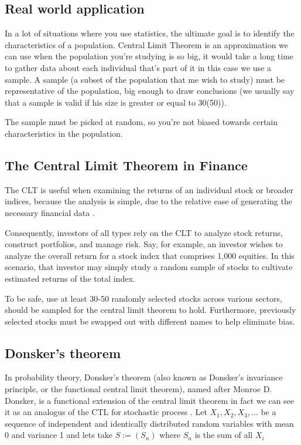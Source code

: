 \documentclass{article}
\begin{document}
\subsection{Real world application}
In a lot of situations where you use statistics, the ultimate goal is to identify the characteristics of a population.\cite{Tijms2007Understanding}
Central Limit Theorem is an approximation we can use when the population you’re studying is so big, it would take a long time to gather data about each individual that’s part of it in this case we use a sample.
A sample  (a subset of the population that me wish to study) must be representative of the population,
big enough to draw conclusions (we usually say that a sample is valid if his size is greater or equal to 30(50)).

The sample must be picked at random, so you’re not biased towards certain characteristics in the population.


 \subsection{The Central Limit Theorem in Finance}
The CLT is useful when examining the returns of an individual stock or broader indices, because the analysis is simple, due to the relative ease of generating the necessary financial data \cite{Ganti2021What}.

Consequently, investors of all types rely on the CLT to analyze stock returns, construct portfolios, and manage risk.
Say, for example, an investor wishes to analyze the overall return for a stock index that comprises 1,000 equities. In this scenario, that investor may simply study a random sample of stocks to cultivate estimated returns of the total index. 

To be safe, use at least 30-50 randomly selected stocks across various sectors, should be sampled for the central limit theorem to hold. Furthermore, previously selected stocks must be swapped out with different names to help eliminate bias. 

\subsection{Donsker’s theorem}
In probability theory, Donsker’s theorem (also known as Donsker’s invariance principle, or the functional central limit theorem), named after Monroe D. Donsker, is a functional extension of the central limit theorem in fact we can see it as an analogus of the CTL for stochastic process .\cite{Matteo202113_R}
Let $ X_1,X_2,X_3,... $ be a sequence of independent and identically distributed random variables with mean 0 and variance 1 and lets take $ S:= (S_n) $ where $S_n $ is the sum of all $X_i$
\end{document}
